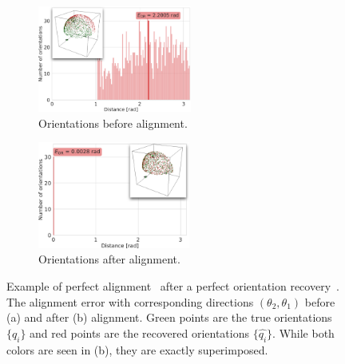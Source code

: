 \begin{figure}[ht!]
\begin{minipage}[t]{0.64\linewidth}
        \begin{subfigure}[t]{0.47\linewidth}
            \centering
            \includegraphics[height=3.5cm]{figures/BeforeAA.pdf}
            \caption{Orientations before alignment.}
        \end{subfigure}
        \hfill
        \begin{subfigure}[t]{0.47\linewidth}
            \centering
            \includegraphics[height=3.5cm]{figures/AfterAA.pdf}
            \caption{Orientations after alignment.}
        \end{subfigure}
        \caption{%
            Example of perfect alignment~ after a perfect orientation recovery~.
            The alignment error with corresponding directions $(\theta_2, \theta_1)$ before (a) and after (b) alignment.
            Green points are the true orientations $\{q_i\}$ and red points are the recovered orientations $\{\widehat{q_i}\}$.
            While both colors are seen in (b), they are exactly superimposed.
        }\label{fig:5j0n-aa-loss-perfect-distances}
    \end{minipage}
\end{figure}

